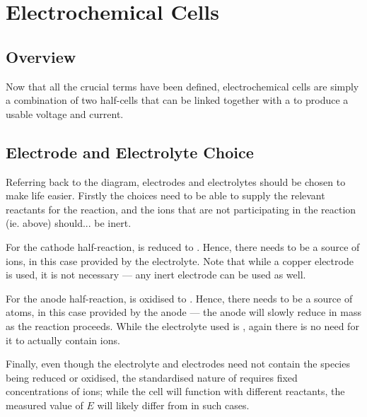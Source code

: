 




	\pagebreak
	\section{Electrochemical Cells}

		\subsection{Overview}

			Now that all the crucial terms have been defined, electrochemical cells are simply a combination of two half-cells that can be
			linked together with a  to produce a usable voltage and current.




		\subsection{Electrode and Electrolyte Choice}

			Referring back to the diagram, electrodes and electrolytes should be chosen to make life easier. Firstly the choices need to be
			able to supply the relevant reactants for the reaction, and the ions that are not participating in the reaction (ie.  above)
			should... be inert.

			For the cathode half-reaction,  is reduced to . Hence, there needs to be a source of  ions,
			in this case provided by the  electrolyte. Note that while a copper electrode is used, it is not necessary --- any
			inert electrode can be used as well.

			For the anode half-reaction,  is oxidised to . Hence, there needs to be a source of  atoms,
			in this case provided by the anode --- the anode will slowly reduce in mass as the reaction proceeds. While the electrolyte
			used is , again there is no need for it to actually contain  ions.

			Finally, even though the electrolyte and electrodes need not contain the species being reduced or oxidised, the standardised nature of
			\Ecell{} requires fixed concentrations of ions; while the cell will function with different reactants, the measured value
			of $E$ will likely differ from \Ecell{} in such cases.

